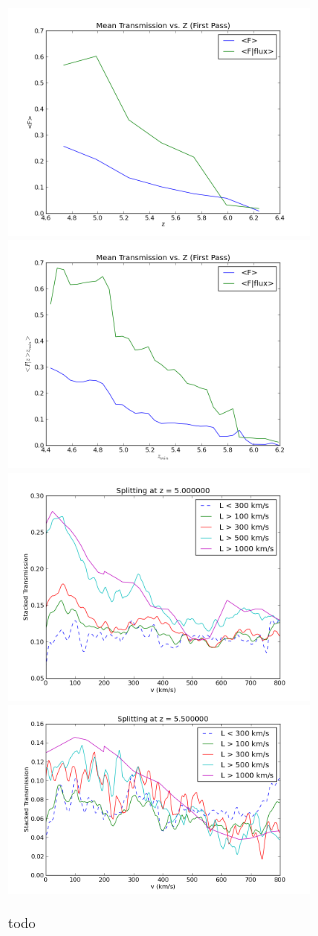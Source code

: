 \documentclass[11pt]{article}
\begin{document}
\begin{figure}[h]
  \centering
  \includegraphics[width=8cm]{meanFs.png}
  \includegraphics[width=8cm]{FluxCDF.png}
  \includegraphics[width=8cm]{Stack_Zgreaterthan5.png}
  \includegraphics[width=8cm]{Stack_Zgreaterthan5p5.png}
  \caption{todo}
  \label{fig:todo}
\end{figure}
\end{document}
